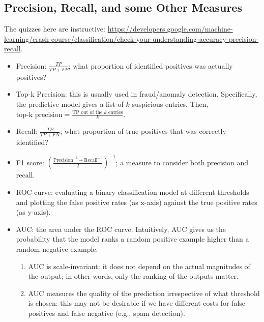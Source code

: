 \subsection{Precision, Recall, and some Other Measures}
    The quizzes here are instructive: \url{https://developers.google.com/machine-learning/crash-course/classification/check-your-understanding-accuracy-precision-recall}.
    \begin{itemize}
        \item Precision: $\frac{TP}{TP + FP}$; what proportion of identified positives was actually positives?
        \item Top-k Precision: this is usually used in fraud/anomaly detection. Specifically, the predictive model gives a list of $k$ suspicious entries.
        Then, $\text{top-k precision} = \frac{\text{TP out of the $k$ entries}}{k}$.
        \item Recall: $\frac{TP}{TP + FN}$; what proportion of true positives that was correctly identified?
        \item F1 score: $\left( \frac{\text{Precision}^{-1} + \text{Recall}^{-1}}{2} \right)^{-1}$; a measure to consider both precision and recall.
        \item ROC curve: evaluating a binary classification model at different thresholds and plotting the false positive rates (as x-axis) against the true positive rates (as y-axis).
        \item AUC: the area under the ROC curve. Intuitively, AUC gives us the probability that the model ranks a random positive example higher than a random negative example.
            \begin{enumerate}
                \item AUC is scale-invariant: it does not depend on the actual magnitudes of the output; in other words, only the ranking of the outputs matter.
                \item AUC measures the quality of the prediction irrespective of what threshold is chosen: this may not be desirable if we have different costs for false positives and false negative (e.g., spam detection).
            \end{enumerate}
    \end{itemize}
    


